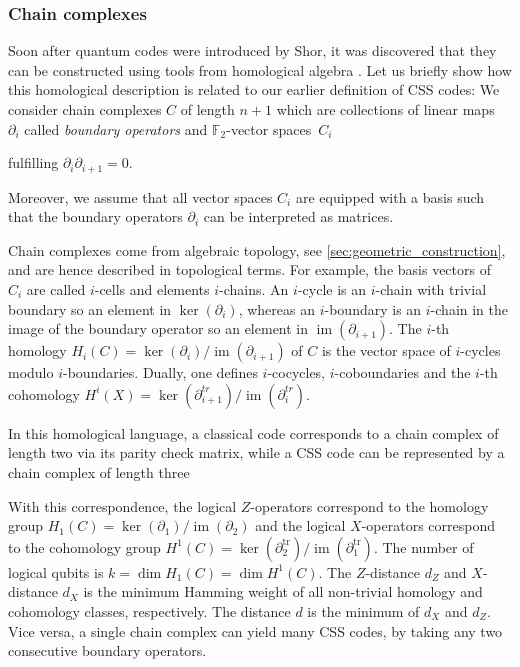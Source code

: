 \documentclass[amsmath, amssymb, floatfix, reprint, twocolumn, notitlepage, 10pt]{revtex4-1}
\newcommand{\change}{}
\newcommand{\tr}{\operatorname{tr}}
\newcommand{\im}{\operatorname{im}}
\begin{document}
\subsubsection{Chain complexes}\label{sec:chain_complexes}
Soon after quantum codes were introduced by Shor, it was discovered that they can be constructed using tools from homological algebra \cite{kitaev2003fault,freedman2001projective,bravyi1998quantum,bombin2007homological}.
Let us briefly show how this homological description is related to our earlier definition of CSS codes:
We consider chain complexes $C$ of length $n+1$ which are collections of linear maps~$\partial_i$ called \emph{boundary operators} and $\mathbb{F}_2$-vector spaces~$C_i$
\begin{center}
\end{center}
fulfilling {\change $\partial_{i}\partial_{i+1}=0.$}
{\change Moreover, we assume that all vector spaces $C_i$ are equipped with a basis such that the boundary operators $\partial_i$ can be interpreted as matrices. 

Chain complexes come from algebraic topology, see \cref{sec:geometric_construction}, and are hence described in topological terms. For example, the basis vectors of~$C_i$ are called $i$-cells and elements $i$-chains. An $i$-cycle is an $i$-chain with trivial boundary so an element in $\ker(\partial_i)$, whereas an $i$-boundary is an $i$-chain in the image of the boundary operator so an element in $\im(\partial_{i+1})$. The $i$-th homology $H_i(C)=\ker(\partial_i)/\im(\partial_{i+1})$ of $C$ is the vector space of $i$-cycles modulo $i$-boundaries. Dually, one defines $i$-cocycles, $i$-coboundaries and the $i$-th cohomology $H^i(X)=\ker(\partial^{tr}_{i+1})/\im(\partial^{tr}_i).$
}


In this homological language, a classical code corresponds to a chain complex of length two via its parity check matrix, while a CSS code can be represented by a chain complex of length three
\begin{center}
\end{center}
With this correspondence, the logical $Z$-operators correspond to the homology group $H_1(C)=\ker(\partial_1)/\im(\partial_2)$ and the logical $X$-operators correspond to the cohomology group $H^1(C)=\ker(\partial_2^{\tr})/\im(\partial_1^{\tr}).$ The number of logical qubits is $k=\dim H_1(C)=\dim H^1(C).$
The $Z$-distance $d_Z$ and $X$-distance $d_X$ is the minimum Hamming weight of all non-trivial homology and cohomology classes, respectively. 
The distance $d$ is the minimum of $d_X$ and $d_Z.$
Vice versa, a single chain complex can yield many CSS codes, by taking any two consecutive boundary operators.
\end{document}
